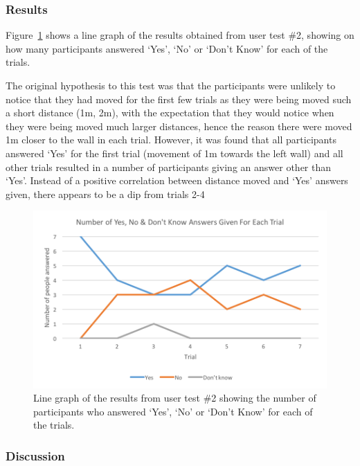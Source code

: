 \documentclass[../../main.tex]{subfiles}
\begin{document}
			\subsubsection{Results}

				Figure~\ref{test2results} shows a line graph of the results obtained from user test \#2, showing on how many participants answered `Yes', `No' or `Don't Know' for each of the trials.

				The original hypothesis to this test was that the participants were unlikely to notice that they had moved for the first few trials as they were being moved such a short distance (1m, 2m), with the expectation that they would notice when they were being moved much larger distances, hence the reason there were moved 1m closer to the wall in each trial. However, it was found that all participants answered `Yes' for the first trial (movement of 1m towards the left wall) and all other trials resulted in a number of participants giving an answer other than `Yes'. Instead of a positive correlation between distance moved and `Yes' answers given, there appears to be a dip from trials 2-4

				\begin{figure}[H]
					\centerline{\includegraphics[scale = 1]{Sections/userTesting/images/test2/Q2_edit.png}}
					\caption{Line graph of the results from user test \#2 showing the number of participants who answered `Yes', `No' or `Don't Know' for each of the trials.}
					\label{test2results}
				\end{figure}

			\subsubsection{Discussion}
\end{document}
